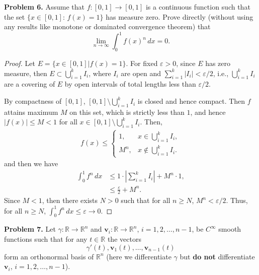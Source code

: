 \documentclass[12pt,leqno]{amsart}
\theoremstyle{definition}
\begin{document}
\noindent
{\bf Problem 6.}
Assume that $f : [0, 1]\to [0, 1]$ is a continuous function such that the set
$\{x\in [0, 1] :\,  f(x) = 1\}$ has measure zero. Prove directly (without using any results like monotone or
dominated convergence theorem) that
$$
\lim_{n\to\infty} \int_0^1 f(x)^n\, dx =0.
$$
\begin{proof}
Let $E = \{x \in [0,1] | f(x) = 1\}$. For fixed $\varepsilon > 0$, since $E$ has zero measure, then $E \subset \bigcup^k_{i=1}I_i$, where $I_i$ are open and $\sum^k_{i=1}|I_i| < \varepsilon/2$, i.e., $\bigcup^k_{i=1}I_i$ are a covering of $E$ by open intervals of total lengths less than $\varepsilon/2$. 

By compactness of $[0,1]$, $[0,1]\setminus \bigcup^k_{i=1}I_i$ is closed and hence compact. Then $f$ attains maximum $M$ on this set, which is strictly less than $1$, and hence $|f(x)| \leq M < 1$ for all $x \in [0,1]\setminus \bigcup^k_{i=1}I_i$. Then,
\begin{align*}
    f(x) \leq \begin{cases}
        1, & x \in \bigcup^k_{i=1}I_i, \\
        M^n, & x \notin \bigcup^k_{i=1}I_i.
    \end{cases}
\end{align*}
and then we have
\begin{align*}
    \int^1_0 f^n\, dx & \leq 1 \cdot \left|\sum^k_{i=1} I_i \right| + M^n \cdot 1, \\
    & \leq \frac{\varepsilon}{2} + M^n.
\end{align*}
Since $M < 1$, then there exists $N > 0$ such that for all $n \geq N$, $M^n < \varepsilon/2$. Thus, for all $n \geq N$, $\int^1_0 f^n\, dx \leq \varepsilon \to 0$.
\end{proof}


\medskip



\noindent
{\bf Problem 7.}
Let $\gamma:\mathbb{R}\to\mathbb{R}^n$ and $\mathbf{v}_i:\mathbb{R}\to\mathbb{R}^n$, $i=1,2,\ldots,n-1$, be $C^\infty$ smooth functions such that
for any $t\in\mathbb{R}$ the vectors
$$
\gamma'(t),\mathbf{v}_1(t),\ldots,\mathbf{v}_{n-1}(t)
$$
form an orthonormal basis of $\mathbb{R}^n$ (here we differentiate $\gamma$ but {\bf do not} differentiate $\mathbf{v}_i$, $i=1,2,\ldots,n-1$).
\end{document}
